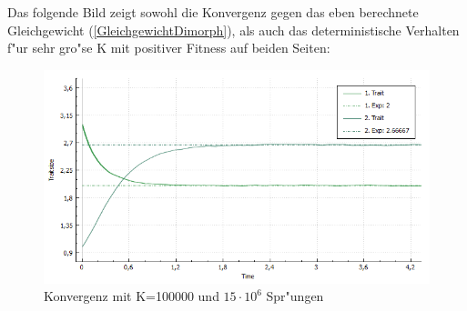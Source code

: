 \documentclass[11pt, a4paper, german]{article}
\theoremstyle{plain}
\begin{document}
		
		Das folgende Bild zeigt sowohl die Konvergenz gegen das eben berechnete Gleichgewicht (\ref{GleichgewichtDimorph}), als auch das deterministische Verhalten f"ur sehr gro"se K mit positiver Fitness auf beiden Seiten:
		\begin{figure}[H]
			\centering
			\includegraphics[width=1\linewidth]{./Pictures/BigKInstance_Equillibrium}
			\caption[Konvergenz_K=100000]{Konvergenz mit K=100000 und $ 15\cdot10^6 $ Spr"ungen}
			\label{Konvergenz_K=100000}
		\end{figure}
	
\end{document}
